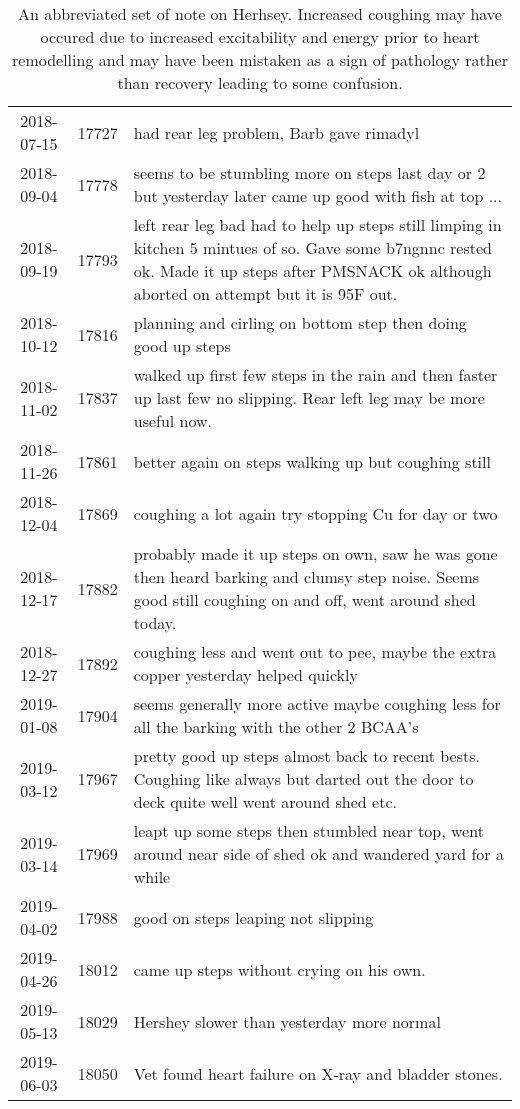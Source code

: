 {\begin{table}[H]
\begin{tabular}{|c|r|p{4in}|}
2018-07-15 & 17727 & had rear leg problem, Barb gave rimadyl \\
2018-09-04 & 17778 &seems to be stumbling more on steps last day or 2 but yesterday later came up good with fish at top ...  \\
2018-09-19 & 17793 & left rear leg bad had to help up steps still limping in kitchen 5 mintues of so. Gave some b7ngnnc rested ok. Made it up steps after PMSNACK ok although aborted on attempt but it is 95F out.   \\
2018-10-12 & 17816 &planning and cirling on bottom step then doing good up steps  \\
2018-11-02 & 17837 & walked up first few steps in the rain and then faster up last few no slipping. Rear left leg may be more useful now.  \\
2018-11-26 & 17861 & better again on steps walking up but coughing still  \\
2018-12-04 & 17869 &coughing a lot again try stopping Cu for day or two  \\
2018-12-17 & 17882 &probably made it up steps on own, saw he was gone then heard barking and clumsy step noise. Seems good still coughing on and off, went around shed today.  \\
2018-12-27 & 17892 &coughing less and went out to pee, maybe the extra copper yesterday helped quickly  \\
2019-01-08 & 17904 & seems generally more active maybe coughing less for all the barking with the other 2 BCAA's \\
2019-03-12 & 17967 & pretty good up steps almost back to recent bests. Coughing like always but darted out the door to deck quite well went around shed etc.  \\
2019-03-14 & 17969 &leapt up some steps then stumbled near top, went around near side of shed ok and wandered yard for a while  \\
2019-04-02 & 17988 &good on steps leaping not slipping  \\
2019-04-26 & 18012 &came up steps without crying on his own.  \\
2019-05-13 & 18029 & Hershey slower than yesterday more normal  \\
2019-06-03 & 18050 &Vet found heart failure on X-ray and bladder stones.   \\
\hline
\hline
\end{tabular}
\caption{ An abbreviated set of note on Herhsey. Increased coughing may have occured due to increased excitability and energy prior to heart remodelling and 
may have been mistaken as a sign of pathology rather than recovery leading
to some confusion. 
   }
\label{tab:hershey}
\end{table}
} %


